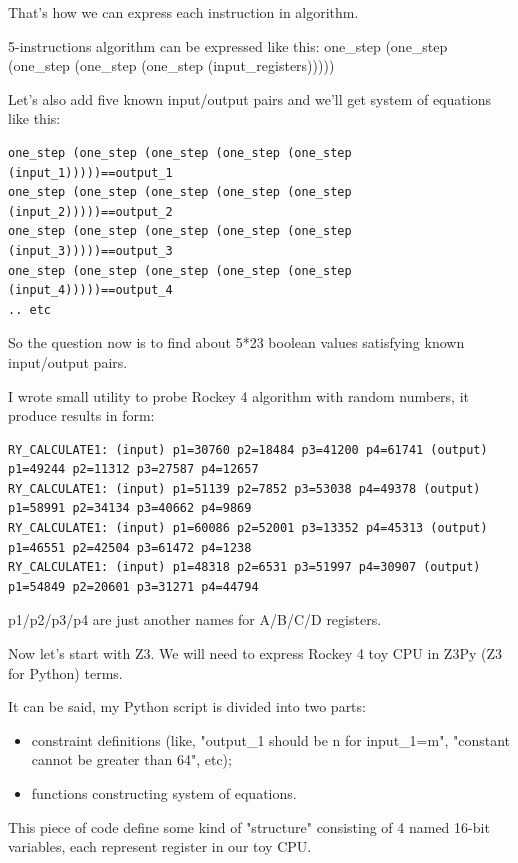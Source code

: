 That's how we can express each instruction in algorithm.

5-instructions algorithm can be expressed like this: one\_step (one\_step (one\_step (one\_step (one\_step (input\_registers)))))

Let's also add five known input/output pairs and we'll get system of equations like this:

\begin{lstlisting}
one_step (one_step (one_step (one_step (one_step (input_1)))))==output_1
one_step (one_step (one_step (one_step (one_step (input_2)))))==output_2
one_step (one_step (one_step (one_step (one_step (input_3)))))==output_3
one_step (one_step (one_step (one_step (one_step (input_4)))))==output_4
.. etc
\end{lstlisting}

So the question now is to find about 5*23 boolean values satisfying known input/output pairs.

I wrote small utility to probe Rockey 4 algorithm with random numbers, it produce results in form:

\begin{lstlisting}
RY_CALCULATE1: (input) p1=30760 p2=18484 p3=41200 p4=61741 (output) p1=49244 p2=11312 p3=27587 p4=12657
RY_CALCULATE1: (input) p1=51139 p2=7852 p3=53038 p4=49378 (output) p1=58991 p2=34134 p3=40662 p4=9869
RY_CALCULATE1: (input) p1=60086 p2=52001 p3=13352 p4=45313 (output) p1=46551 p2=42504 p3=61472 p4=1238
RY_CALCULATE1: (input) p1=48318 p2=6531 p3=51997 p4=30907 (output) p1=54849 p2=20601 p3=31271 p4=44794
\end{lstlisting}

p1/p2/p3/p4 are just another names for A/B/C/D registers.

Now let's start with Z3. We will need to express Rockey 4 toy CPU in Z3Py (Z3 for Python) terms.

It can be said, my Python script is divided into two parts: 

\begin{itemize}
\item
constraint definitions (like, "output\_1 should be n for input\_1=m", "constant cannot be greater than 64", etc); 

\item
functions constructing system of equations.
\end{itemize}

This piece of code define some kind of "structure" consisting of 4 named 16-bit variables, each represent register in our toy CPU.

